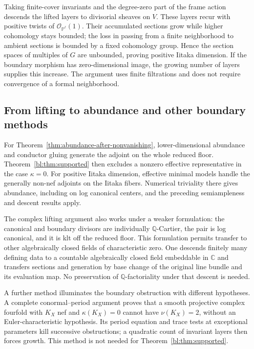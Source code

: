 Taking finite-cover invariants and the degree-zero part of the frame
action descends the lifted layers to divisorial sheaves on $V$.
These layers recur with positive twists of $\mathcal O_{\mathbb P^\ell}(1)$.
Their accumulated sections grow while higher cohomology stays bounded;
the loss in passing from a finite neighborhood to ambient sections is
bounded by a fixed cohomology group. Hence the section spaces of
multiples of $G$ are unbounded, proving positive Iitaka dimension.
If the boundary morphism has zero-dimensional image, the growing number
of layers supplies this increase. The argument uses finite filtrations
and does not require convergence of a formal neighborhood.

\subsection*{From lifting to abundance and other boundary methods}

For Theorem~\ref{thm:abundance-after-nonvanishing}, lower-dimensional abundance and
conductor gluing generate the adjoint on the whole reduced floor.
Theorem~\ref{bl:thm:supported} then excludes a nonzero effective
representative in the case $\kappa=0$. For positive Iitaka dimension,
effective minimal models handle the generally non-nef adjoints on the
Iitaka fibers. Numerical triviality there gives abundance, including
on log canonical centers, and the preceding semiampleness and descent
results apply.

The complex lifting argument also works under a weaker formulation:
the canonical and boundary divisors are individually $\mathbb Q$-Cartier,
the pair is log canonical, and it is klt off the reduced floor. This
formulation permits transfer to other algebraically closed fields of
characteristic zero. One descends finitely many defining data to a countable algebraically closed
field embeddable in $\mathbb C$ and transfers sections and generation
by base change of the original line bundle and its evaluation map.
No preservation of $\mathbb Q$-factoriality under that descent is needed.

A further method illuminates the boundary obstruction with different
hypotheses. A complete conormal--period argument proves that a smooth
projective complex fourfold with $K_X$ nef and $\kappa(K_X)=0$ cannot
have $\nu(K_X)=2$, without an Euler-characteristic hypothesis.
Its period equation and trace tests at exceptional parameters kill
successive obstructions; a quadratic count of invariant layers then
forces growth. This method is not needed for
Theorem~\ref{bl:thm:supported}.

